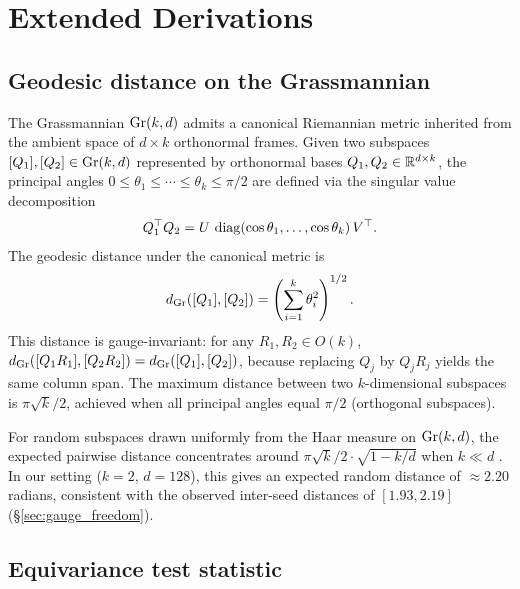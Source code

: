 
\section{Extended Derivations}
\label{app:derivations}

\subsection{Geodesic distance on the Grassmannian}
\label{app:geodesic}

The Grassmannian $\mathrm{Gr}(k,d)$ admits a canonical Riemannian metric inherited
from the ambient space of $d \times k$ orthonormal frames. Given two
subspaces $[Q_1], [Q_2] \in \mathrm{Gr}(k,d)$ represented by orthonormal bases
$Q_1, Q_2 \in \mathbb{R}^{d \times k}$, the principal angles
$0 \leq \theta_1 \leq \cdots \leq \theta_k \leq \pi/2$ are defined via
the singular value decomposition
\begin{equation}
Q_1^\top Q_2 = U \, \operatorname{diag}(\cos\theta_1, \ldots, \cos\theta_k) \, V^\top.
\label{eq:principal_angles_svd}
\end{equation}
The geodesic distance under the canonical metric is
\begin{equation}
d_{\mathrm{Gr}}([Q_1],[Q_2]) = \left(\sum_{i=1}^k \theta_i^2\right)^{1/2}.
\label{eq:geodesic_full}
\end{equation}
This distance is gauge-invariant: for any $R_1, R_2 \in O(k)$,
$d_{\mathrm{Gr}}([Q_1 R_1], [Q_2 R_2]) = d_{\mathrm{Gr}}([Q_1], [Q_2])$, because replacing
$Q_j$ by $Q_j R_j$ yields the same column span. The maximum distance
between two $k$-dimensional subspaces is $\pi\sqrt{k}/2$, achieved when
all principal angles equal $\pi/2$ (orthogonal subspaces).

For random subspaces drawn uniformly from the Haar measure on $\mathrm{Gr}(k,d)$,
the expected pairwise distance concentrates around
$\pi\sqrt{k}/2 \cdot \sqrt{1 - k/d}$ when $k \ll d$
\citep{edelman1998geometry, absil2008optimization}. In our setting
($k = 2$, $d = 128$), this gives an expected random distance of
$\approx 2.20$ radians, consistent with the observed inter-seed distances
of $[1.93, 2.19]$ (\S\ref{sec:gauge_freedom}).

\subsection{Equivariance test statistic}
\label{app:equiv_test}

